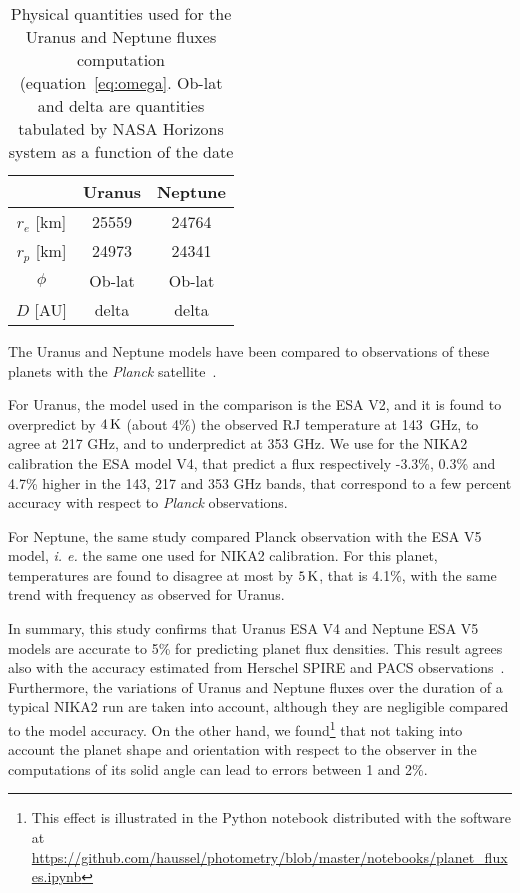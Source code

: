 \begin{table}[!ht]
\begin{center}
\begin{tabular}{|c|c|c|}
\hline
     & Uranus & Neptune \\
\hline
$r_{e}$ [km]  & 25559 & 24764 \\ 
\hline
$r_{p}$ [km]  & 24973 & 24341  \\
\hline
$\phi$         & Ob-lat & Ob-lat \\
\hline
$D$   [AU]    & delta   & delta \\
\hline
\end{tabular}
\end{center}
\caption[Primary calibrator flux models]{Physical quantities used for the Uranus and Neptune fluxes
  computation (equation~\ref{eq:omega}. Ob-lat and delta are quantities 
  tabulated by NASA Horizons system as a function of the date}
\label{tab:planetphysparam}
\end{table}

The Uranus and Neptune models have been compared to 
observations of these planets with the \emph{Planck}
satellite~\citep{PLCK-LII}.

For Uranus, the model used in the comparison
is the ESA V2, and it is found to overpredict by $4\,\rm{K}$ (about 4\%) the
observed RJ temperature at 143~GHz, to agree at 217 GHz, and
to underpredict at 353 GHz. We use for the NIKA2 calibration the ESA
model V4, that predict a flux respectively -3.3\%, 0.3\% and 4.7\% higher in the
143, 217 and 353 GHz bands, that correspond to a few percent accuracy
with respect to \emph{Planck} observations.

For Neptune, the same study compared Planck observation with the ESA V5
model, {\it i. e.} the same one used for NIKA2 calibration. For this
planet, temperatures are found to disagree at most by $5\, \rm{K}$, that is 4.1\%,
with the same trend with frequency as observed for Uranus.

In summary, this study confirms that Uranus ESA V4 and Neptune ESA V5
models are accurate to 5\% for predicting planet flux densities. This
result agrees also with the accuracy estimated from Herschel SPIRE
and PACS observations~\citep{Mueller2016, Swinyard2014}. 
Furthermore, the variations of Uranus and Neptune fluxes over the duration of a typical
NIKA2 run are taken into account, although they are negligible
compared to the model accuracy. On the other hand, we
found\footnote{This effect is illustrated in the Python notebook
  distributed with the software at \url{https://github.com/haussel/photometry/blob/master/notebooks/planet_fluxes.ipynb}} that not
taking into account the planet shape and orientation with respect to
the observer in the computations of its solid angle can lead to errors
between 1 and 2\%.


